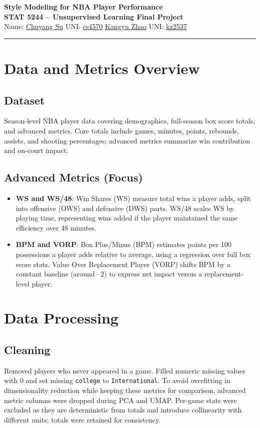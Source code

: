 \documentclass[12pt]{article}
\begin{document}
\begin{center}
    {\Large \textbf{Style Modeling for NBA Player Performance}\\[6pt]
    \textbf{STAT 5244 -- Unsupervised Learning Final Project}\\[6pt]}
    Name: \underline{Chuyang Su} \quad UNI: \underline{cs4570} 
    \quad \underline{Kangyu Zhao} \quad UNI: \underline{kz2537} \\

\end{center}

\hrule
\vspace{1em}

\section{Data and Metrics Overview}
\subsection{Dataset}
Season-level NBA player data covering demographics, full-season box score totals, and advanced metrics. Core totals include games, minutes, points, rebounds, assists, and shooting percentages; advanced metrics summarize win contribution and on-court impact.

\subsection{Advanced Metrics (Focus)}
\begin{itemize}[leftmargin=*]
    \item \textbf{WS and WS/48}: Win Shares (WS) measure total wins a player adds, split into offensive (OWS) and defensive (DWS) parts. WS/48 scales WS by playing time, representing wins added if the player maintained the same efficiency over 48 minutes.
    \item \textbf{BPM and VORP}: Box Plus/Minus (BPM) estimates points per 100 possessions a player adds relative to average, using a regression over full box score stats. Value Over Replacement Player (VORP) shifts BPM by a constant baseline (around --2) to express net impact versus a replacement-level player.
\end{itemize}

\section{Data Processing}
\subsection{Cleaning}
Removed players who never appeared in a game. Filled numeric missing values with 0 and set missing \texttt{college} to \texttt{International}. To avoid overfitting in dimensionality reduction while keeping these metrics for comparison, advanced metric columns were dropped during PCA and UMAP. Per-game stats were excluded as they are deterministic from totals and introduce collinearity with different units; totals were retained for consistency.
\end{document}
